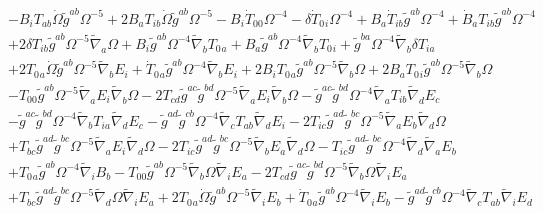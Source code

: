 \documentclass[10pt,letterpaper]{article}
\numberwithin{equation}{section}
\begin{document}
\begin{eqnarray}
&& -  B_{i} T_{ab} \dot{\Omega} \tilde{g}^{ab} \Omega^{-5} + 2 B_{a} T_{ib} \dot{\Omega} \tilde{g}^{ab} \Omega^{-5} -  B_{i} \dot{T}_{00}{} \Omega^{-4} -  \delta \dot{T}_{0}{}_{i} \Omega^{-4} + B_{a} \dot{T}_{ib} \tilde{g}^{ab} \Omega^{-4} + \dot{B}_{a} T_{ib} \tilde{g}^{ab} \Omega^{-4} \nonumber \\ 
&& + 2 \delta T_{ib} \tilde{g}^{ab} \Omega^{-5} \tilde{\nabla}_{a}\Omega + B_{i} \tilde{g}^{ab} \Omega^{-4} \tilde{\nabla}_{b}T_{0}{}_{a} + B_{a} \tilde{g}^{ab} \Omega^{-4} \tilde{\nabla}_{b}T_{0}{}_{i} + \tilde{g}^{ba} \Omega^{-4} \tilde{\nabla}_{b}\delta T_{ia} \nonumber \\ 
&& + 2 T_{0}{}_{a} \dot{\Omega} \tilde{g}^{ab} \Omega^{-5} \tilde{\nabla}_{b}E_{i} + \dot{T}_{0}{}_{a} \tilde{g}^{ab} \Omega^{-4} \tilde{\nabla}_{b}E_{i} + 2 B_{i} T_{0}{}_{a} \tilde{g}^{ab} \Omega^{-5} \tilde{\nabla}_{b}\Omega + 2 B_{a} T_{0}{}_{i} \tilde{g}^{ab} \Omega^{-5} \tilde{\nabla}_{b}\Omega \nonumber \\ 
&& -  T_{00}{} \tilde{g}^{ab} \Omega^{-5} \tilde{\nabla}_{a}E_{i} \tilde{\nabla}_{b}\Omega - 2 T_{cd} \tilde{g}^{ac} \tilde{g}^{bd} \Omega^{-5} \tilde{\nabla}_{a}E_{i} \tilde{\nabla}_{b}\Omega -  \tilde{g}^{ac} \tilde{g}^{bd} \Omega^{-4} \tilde{\nabla}_{a}T_{ib} \tilde{\nabla}_{d}E_{c} \nonumber \\ 
&& -  \tilde{g}^{ac} \tilde{g}^{bd} \Omega^{-4} \tilde{\nabla}_{b}T_{ia} \tilde{\nabla}_{d}E_{c} -  \tilde{g}^{ad} \tilde{g}^{cb} \Omega^{-4} \tilde{\nabla}_{c}T_{ab} \tilde{\nabla}_{d}E_{i} - 2 T_{ic} \tilde{g}^{ad} \tilde{g}^{bc} \Omega^{-5} \tilde{\nabla}_{a}E_{b} \tilde{\nabla}_{d}\Omega \nonumber \\ 
&& + T_{bc} \tilde{g}^{ad} \tilde{g}^{bc} \Omega^{-5} \tilde{\nabla}_{a}E_{i} \tilde{\nabla}_{d}\Omega - 2 T_{ic} \tilde{g}^{ad} \tilde{g}^{bc} \Omega^{-5} \tilde{\nabla}_{b}E_{a} \tilde{\nabla}_{d}\Omega -  T_{ic} \tilde{g}^{ad} \tilde{g}^{bc} \Omega^{-4} \tilde{\nabla}_{d}\tilde{\nabla}_{a}E_{b} \nonumber \\ 
&& + T_{0}{}_{a} \tilde{g}^{ab} \Omega^{-4} \tilde{\nabla}_{i}B_{b} -  T_{00}{} \tilde{g}^{ab} \Omega^{-5} \tilde{\nabla}_{b}\Omega \tilde{\nabla}_{i}E_{a} - 2 T_{cd} \tilde{g}^{ac} \tilde{g}^{bd} \Omega^{-5} \tilde{\nabla}_{b}\Omega \tilde{\nabla}_{i}E_{a} \nonumber \\ 
&& + T_{bc} \tilde{g}^{ad} \tilde{g}^{bc} \Omega^{-5} \tilde{\nabla}_{d}\Omega \tilde{\nabla}_{i}E_{a} + 2 T_{0}{}_{a} \dot{\Omega} \tilde{g}^{ab} \Omega^{-5} \tilde{\nabla}_{i}E_{b} + \dot{T}_{0}{}_{a} \tilde{g}^{ab} \Omega^{-4} \tilde{\nabla}_{i}E_{b} -  \tilde{g}^{ad} \tilde{g}^{cb} \Omega^{-4} \tilde{\nabla}_{c}T_{ab} \tilde{\nabla}_{i}E_{d} \nonumber \\ 

\end{eqnarray}
\end{document}
